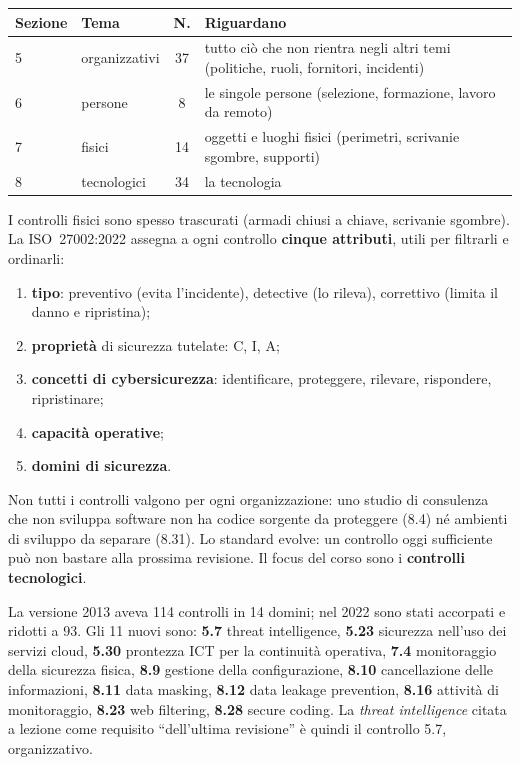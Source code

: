 \begin{center}
\small
\begin{tabularx}{\linewidth}{l l c X}
\toprule
\textbf{Sezione} & \textbf{Tema} & \textbf{N.} & \textbf{Riguardano}\\
\midrule
5 & organizzativi & 37 & tutto ciò che non rientra negli altri temi (politiche, ruoli, fornitori, incidenti)\\
6 & persone & 8 & le singole persone (selezione, formazione, lavoro da remoto)\\
7 & fisici & 14 & oggetti e luoghi fisici (perimetri, scrivanie sgombre, supporti)\\
8 & tecnologici & 34 & la tecnologia\\
\bottomrule
\end{tabularx}
\end{center}

\noindent I controlli fisici sono spesso trascurati (armadi chiusi a chiave, scrivanie sgombre). La
ISO~27002:2022 assegna a ogni controllo \textbf{cinque attributi}, utili per filtrarli e ordinarli:
\begin{enumerate}
  \item \textbf{tipo}: preventivo (evita l'incidente), detective (lo rileva), correttivo (limita il danno e
    ripristina);
  \item \textbf{proprietà} di sicurezza tutelate: C, I, A;
  \item \textbf{concetti di cybersicurezza}: identificare, proteggere, rilevare, rispondere, ripristinare;
  \item \textbf{capacità operative};
  \item \textbf{domini di sicurezza}.
\end{enumerate}

Non tutti i controlli valgono per ogni organizzazione: uno studio di consulenza che non sviluppa software non
ha codice sorgente da proteggere (8.4) né ambienti di sviluppo da separare (8.31). Lo standard evolve: un
controllo oggi sufficiente può non bastare alla prossima revisione. Il focus del corso sono i
\textbf{controlli tecnologici}.

\begin{integrazione}
La versione 2013 aveva 114 controlli in 14 domini; nel 2022 sono stati accorpati e ridotti a 93. Gli 11
nuovi sono: \textbf{5.7} threat intelligence, \textbf{5.23} sicurezza nell'uso dei servizi cloud,
\textbf{5.30} prontezza ICT per la continuità operativa, \textbf{7.4} monitoraggio della sicurezza fisica,
\textbf{8.9} gestione della configurazione, \textbf{8.10} cancellazione delle informazioni, \textbf{8.11}
data masking, \textbf{8.12} data leakage prevention, \textbf{8.16} attività di monitoraggio, \textbf{8.23}
web filtering, \textbf{8.28} secure coding. La \emph{threat intelligence} citata a lezione come requisito
``dell'ultima revisione'' è quindi il controllo 5.7, organizzativo.
\end{integrazione}

